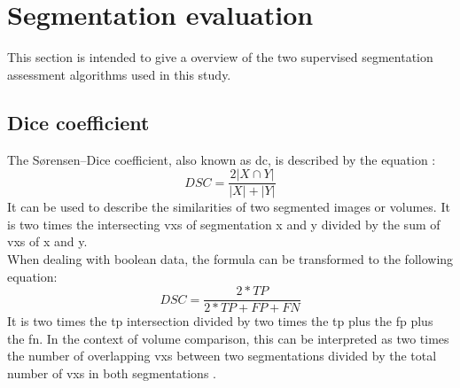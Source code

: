 \section{Segmentation evaluation}\label{s:b-seg-eval}
This section is intended to give a overview of the two supervised segmentation assessment algorithms used in this study.

\subsection{Dice coefficient}
The S\o{}rensen–Dice coefficient, also known as \acrfull{dc}, is described by the equation \cite{diceMeasuresAmountEcologic1945}:\\
\begin{equation}\label{eqn:dice-coefficient}
	DSC=\frac{2|X\cap Y|}{|X|+|Y|}
\end{equation}
\noindent
It can be used to describe the similarities of two segmented images or volumes.
It is two times the intersecting \glspl{vx} of segmentation x and y divided by the sum of \glspl{vx} of x and y.\\
When dealing with boolean data, the formula can be transformed to the following equation:\\
\begin{equation}\label{eqn:binary-dice-coefficient}
	DSC=\frac{2*TP}{2*TP+FP+FN}
\end{equation}
\noindent
It is two times the \acrfull{tp} intersection divided by two times the \acrlong{tp} plus the \acrfull{fp} plus the \acrfull{fn}.
In the context of volume comparison, this can be interpreted as two times the number of overlapping \glspl{vx} between two segmentations divided by the total number of \glspl{vx} in both segmentations \cite{schelbComparisonProstateMRI2021}.\\

